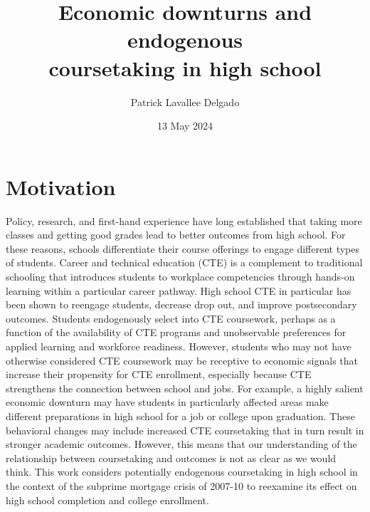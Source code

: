 \documentclass[letterpaper, 12pt]{article}
\title{Economic downturns and endogenous \\coursetaking in high school}
\author{Patrick Lavallee Delgado}
\date{13 May 2024}
\begin{document}

\setlength{\abovedisplayskip}{0 em}


\maketitle

\section{Motivation}

Policy, research, and first-hand experience have long established that taking more classes and getting good grades lead to better outcomes from high school. For these reasons, schools differentiate their course offerings to engage different types of students. Career and technical education (CTE) is a complement to traditional schooling that introduces students to workplace competencies through hands-on learning within a particular career pathway. High school CTE in particular has been shown to reengage students, decrease drop out, and improve postsecondary outcomes. Students endogenously select into CTE coursework, perhaps as a function of the availability of CTE programs and unobservable preferences for applied learning and workforce readiness. However, students who may not have otherwise considered CTE coursework may be receptive to economic signals that increase their propensity for CTE enrollment, especially because CTE strengthens the connection between school and jobs. For example, a highly salient economic downturn may have students in particularly affected areas make different preparations in high school for a job or college upon graduation. These behavioral changes may include increased CTE coursetaking that in turn result in stronger academic outcomes. However, this means that our understanding of the relationship between coursetaking and outcomes is not as clear as we would think. This work considers potentially endogenous coursetaking in high school in the context of the subprime mortgage crisis of 2007-10 to reexamine its effect on high school completion and college enrollment.
\end{document}
